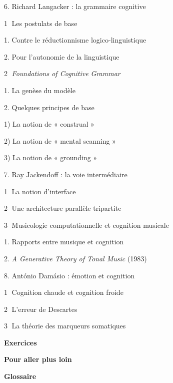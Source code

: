 \begin{keybox}
\hspace*{1em}6. Richard Langacker : la grammaire cognitive\par
\hspace*{2em}\textcircled{\scriptsize 1} Les postulats de base\par
\hspace*{3em}1. Contre le réductionnisme logico-linguistique\par
\hspace*{3em}2. Pour l’autonomie de la linguistique\par
\hspace*{2em}\textcircled{\scriptsize 2} \emph{Foundations of Cognitive Grammar}\par
\hspace*{3em}1. La genèse du modèle\par
\hspace*{3em}2. Quelques principes de base\par
\hspace*{4em}1) La notion de « construal »\par
\hspace*{4em}2) La notion de « mental scanning »\par
\hspace*{4em}3) La notion de « grounding »\par
\hspace*{1em}7. Ray Jackendoff : la voie intermédiaire\par
\hspace*{2em}\textcircled{\scriptsize 1} La notion d’interface\par
\hspace*{2em}\textcircled{\scriptsize 2} Une architecture parallèle tripartite\par
\hspace*{2em}\textcircled{\scriptsize 3} Musicologie computationnelle et cognition musicale\par
\hspace*{3em}1. Rapports entre musique et cognition\par
{}
\hspace*{3em}2. \emph{A Generative Theory of Tonal Music} (1983)\par
\hspace*{1em}8. António Damásio : émotion et cognition\par
\hspace*{2em}\textcircled{\scriptsize 1} Cognition chaude et cognition froide\par
\hspace*{2em}\textcircled{\scriptsize 2} L’erreur de Descartes\par
\hspace*{2em}\textcircled{\scriptsize 3} La théorie des marqueurs somatiques\par
\textbf{Exercices}\par\textbf{Pour aller plus loin}\par\textbf{Glossaire}
\end{keybox}


